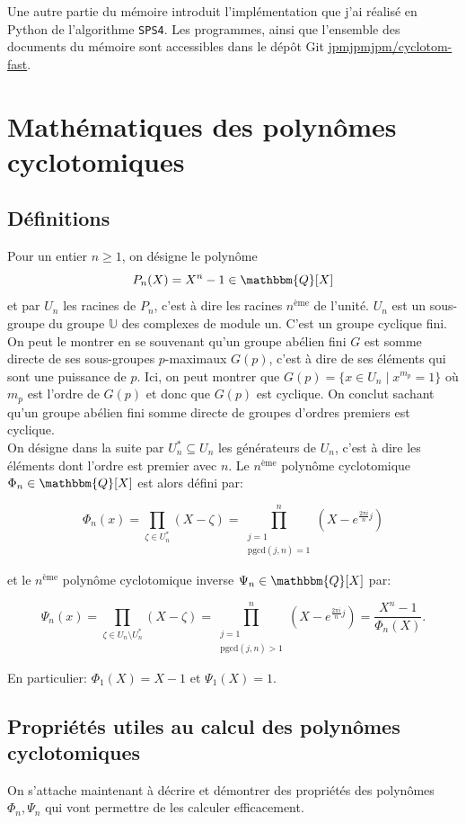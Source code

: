 \documentclass{article}
\newcommand{\Q}{\mathbbm{Q}}
\newcommand{\pgcd}{\mathrm{pgcd}}
\theoremstyle{break}                  %
\begin{document}
Une autre partie du mémoire introduit l'implémentation que j'ai réalisé en Python de l'algorithme \texttt{SPS4}. Les programmes, ainsi que l'ensemble des documents du mémoire sont accessibles dans le dépôt Git \href{https://github.com/jpmjpmjpm/cyclotom-fast}{jpmjpmjpm/cyclotom-fast}.



\section*{Mathématiques des polynômes cyclotomiques}
\subsection*{Définitions}
Pour un entier $n \ge 1$, on désigne le polynôme $$P_n(X) = X^n - 1 \in \Q[X]$$ et par $U_n$ les racines de $P_n$, c'est à dire les racines $n^{\text{ème}}$ de l'unité. $U_n$ est un sous-groupe du groupe $\mathbb U$ des complexes de module un. C'est un groupe cyclique fini. On peut le montrer en se souvenant qu'un groupe abélien fini $G$ est somme directe de ses sous-groupes $p$-maximaux $G(p)$, c'est à dire de ses éléments qui sont une puissance de $p$. Ici, on peut montrer que $G(p) = \{x \in U_n \mid x^{m_p} = 1\}$ où $m_p$ est l'ordre de $G(p)$ et donc que $G(p)$ est cyclique. On conclut sachant qu'un groupe abélien fini somme directe de groupes d'ordres premiers est cyclique.\\


On désigne dans la suite par $U_n^* \subseteq U_n$ les générateurs de $U_n$, c'est à dire les éléments dont l'ordre est premier avec $n$. Le $n^{\text{ème}}$ polynôme cyclotomique $\Phi_n \in \Q[X]$ est alors défini par:

$$\Phi_n(x) = \prod_{\zeta \in U^*_n} (X - \zeta) = \prod_{\substack{j=1\\ \pgcd(j,n)=1}}^n (X - e^{\frac{2 \pi i}{n}j})$$

et le $n^{\text{ème}}$ polynôme cyclotomique inverse $\Psi_n \in \Q[X]$ par:

$$\Psi_n(x) = \prod_{\zeta \in U_n \setminus U^*_n} (X - \zeta) = \prod_{\substack{j=1\\ \pgcd(j,n) > 1}}^n (X - e^{\frac{2 \pi i}{n}j}) = \frac{X^n - 1}{\Phi_n(X)}.$$

En particulier: $\Phi_1(X) = X-1$ et $\Psi_1(X) = 1$.

\subsection*{Propriétés utiles au calcul des polynômes cyclotomiques}
On s'attache maintenant à décrire et démontrer des propriétés des polynômes $\Phi_n, \Psi_n$ qui vont permettre de les calculer efficacement. 
\end{document}
